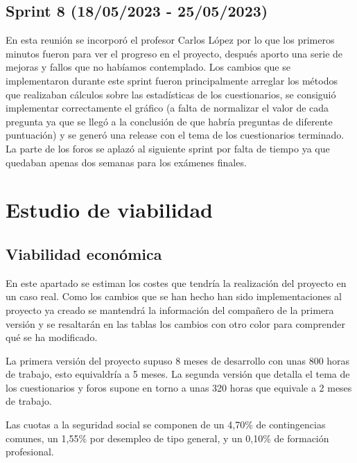 \subsection{Sprint 8 (18/05/2023 - 25/05/2023)}
	En esta reunión se incorporó el profesor Carlos López por lo que los primeros minutos fueron para ver el progreso en el proyecto, después aporto una serie de mejoras y fallos que no habíamos contemplado. Los cambios que se implementaron durante este sprint fueron principalmente arreglar los métodos que realizaban cálculos sobre las estadísticas de los cuestionarios, se consiguió implementar correctamente el gráfico (a falta de normalizar el valor de cada pregunta ya que se llegó a la conclusión de que habría preguntas de diferente puntuación) y se generó una release con el tema de los cuestionarios terminado. La parte de los foros se aplazó al siguiente sprint por falta de tiempo ya que quedaban apenas dos semanas para los exámenes finales.

\section{Estudio de viabilidad}

\subsection{Viabilidad económica}
En este apartado se estiman los costes que tendría la realización del proyecto en un caso real. Como los cambios que se han hecho han sido implementaciones al proyecto ya creado se mantendrá la información del compañero de la primera versión\cite{previotfganexos} y se resaltarán en las tablas los cambios con otro color para comprender qué se ha modificado.

La primera versión del proyecto supuso 8 meses de desarrollo con unas 800 horas de trabajo, esto equivaldría a 5 meses. La segunda versión que detalla el tema de los cuestionarios y foros supone en torno a unas 320 horas que equivale a 2 meses de trabajo.
\begin{table}[H]
	\centering
	\caption{Costes de personal}
\end{table}
Las cuotas a la seguridad social se componen de un 4,70\% de contingencias comunes, un 1,55\% por desempleo de tipo general, y un 0,10\% de formación profesional.

